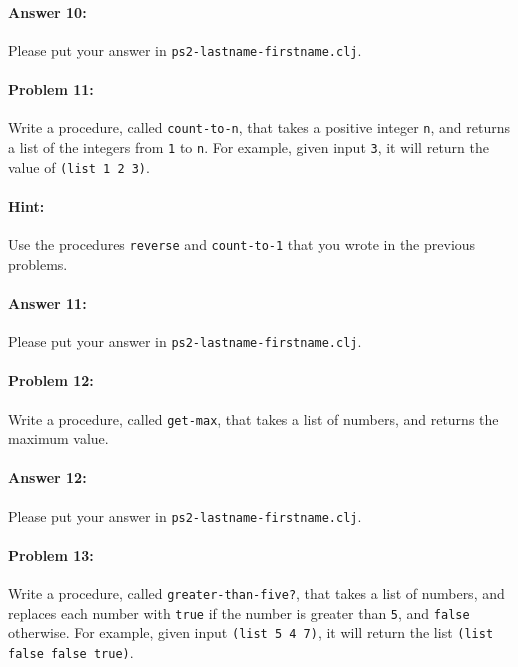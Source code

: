 \documentclass[10pt]{article}
\newcommand{\PSnum}{2}
\begin{document}
\paragraph{Answer 10:} Please put your answer in \texttt{ps\PSnum-lastname-firstname.clj}.

\noindent\hrulefill %

\paragraph{Problem 11:}
  Write a procedure, called \texttt{count-to-n}, that takes a positive
  integer \texttt{n}, and returns a list of the integers from
  \texttt{1} to \texttt{n}. For example, given input \texttt{3}, it
  will return the value of \texttt{(list 1 2 3)}. 
  
\paragraph{Hint:} 
  Use the procedures \texttt{reverse} 
  and \texttt{count-to-1} that you wrote in the previous problems.

\paragraph{Answer 11:} Please put your answer in \texttt{ps\PSnum-lastname-firstname.clj}.

\noindent\hrulefill %

\paragraph{Problem 12:}
  Write a procedure, called \texttt{get-max}, that takes a list of numbers,
  and returns the maximum value.

\paragraph{Answer 12:} Please put your answer in \texttt{ps\PSnum-lastname-firstname.clj}.

\noindent\hrulefill %

\paragraph{Problem 13:}
  Write a procedure, called \texttt{greater-than-five?}, that takes a
  list of numbers, and replaces each number with \texttt{true} if the
  number is greater than \texttt{5}, and \texttt{false} otherwise. For
  example, given input \texttt{(list 5 4 7)}, it will return the list
  \texttt{(list false false true)}. 
\end{document}
